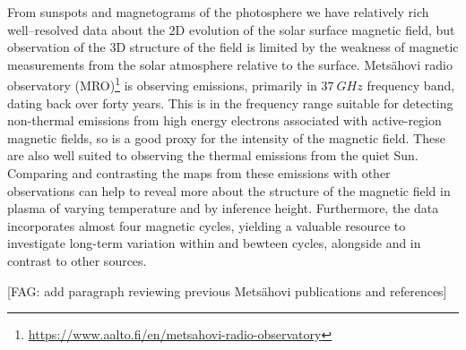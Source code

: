 \documentclass{aa}
\newcommand{\fag}[1]{\textcolor{midpurple}{[FAG: #1]}} %
\begin{document}
  From sunspots and magnetograms of the photosphere we have relatively rich
  well--resolved
  data about the 
  2D 
  evolution of the solar surface magnetic 
  field, but observation of the 3D structure of the field is limited by the 
  weakness of magnetic measurements from the solar atmosphere relative to the
  surface.
  Mets\"ahovi radio observatory (MRO)\footnote{
  \href{https://www.aalto.fi/en/metsahovi-radio-observatory}{
        https://www.aalto.fi/en/metsahovi-radio-observatory}}
  is observing emissions, primarily in
  $\SI{37}{GHz}$ frequency band, dating back over forty years.
  This is in the frequency range suitable for detecting non-thermal emissions
  from high energy electrons associated with active-region magnetic fields, so
  is a good proxy for the intensity of the magnetic field.
  These are also well suited to observing the thermal emissions from the quiet
  Sun.
  Comparing and contrasting the maps from these emissions with other
  observations can help to reveal more about the structure of the magnetic
  field in plasma of varying temperature and by inference height.
  Furthermore, the data incorporates almost four magnetic cycles, yielding
  a valuable resource to investigate long-term variation within and bewteen 
  cycles, alongside and in contrast to other sources.

  \fag{add paragraph reviewing previous Mets\"ahovi publications and references}
\end{document}
